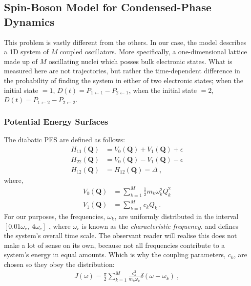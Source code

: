 \subsection{Spin-Boson Model for Condensed-Phase Dynamics}\label{sb:sb}
%
This problem is vastly different from the others. In our case, the model describes a 1D system of $ M $ coupled oscillators. More specifically, a one-dimensional lattice made up of $ M $ oscillating nuclei which posses bulk electronic states. What is measured here are not trajectories, but rather the time-dependent difference in the probability of finding the system in either of two electronic states; when the initial state $ =1 $, $ D(t) = P_{1\leftarrow 1} - P_{2\leftarrow 1}$, when the initial state $ =2 $, $ D(t) = P_{1\leftarrow 2} - P_{2\leftarrow 2}$.
%
\subsubsection{Potential Energy Surfaces}
%
The diabatic PES are defined as follows:
\begin{subequations}\label{eq:sbpes1}
\begin{align}
H_{11}(\bm{Q}) &= V_{0}(\bm{Q}) + V_{1}(\bm{Q}) + \epsilon \\
H_{22}(\bm{Q}) &= V_{0}(\bm{Q}) - V_{1}(\bm{Q}) - \epsilon \\
H_{12}(\bm{Q}) &= H_{12}(\bm{Q}) = \Delta~,
\end{align}
\end{subequations}
where,
\begin{subequations}\label{eq:sbpes2}
\begin{align}
V_{0}(\bm{Q}) &= \sum\limits_{k=1}^{M} \frac{1}{2} m_{k} \omega_{k}^{2} Q_{k}^{2} \\
V_{1}(\bm{Q}) &= \sum\limits_{k=1}^{M} c_{k} Q_{k}~.
\end{align}
\end{subequations}
For our purposes, the frequencies, $ \omega_{k} $, are uniformly distributed in the interval $ [0.01 \omega_{c},~4 \omega_{c}] $ \cite{spin-boson}, where $ \omega_{c} $ is known as the \emph{characteristic frequency}, and defines the system's overall time scale. The observant reader will realise this does not make a lot of sense on its own, because not all frequencies contribute to a system's energy in equal amounts. Which is why the coupling parameters, $ c_{k} $, are chosen so they obey the distribution:
\begin{align}\label{eq:sb_dd}
J(\omega) = \frac{\pi}{2} \sum\limits_{k=1}^{M} \frac{c_{k}^{2}}{m_{k} \omega_{k}}  \delta(\omega - \omega_{k})~,
\end{align}
